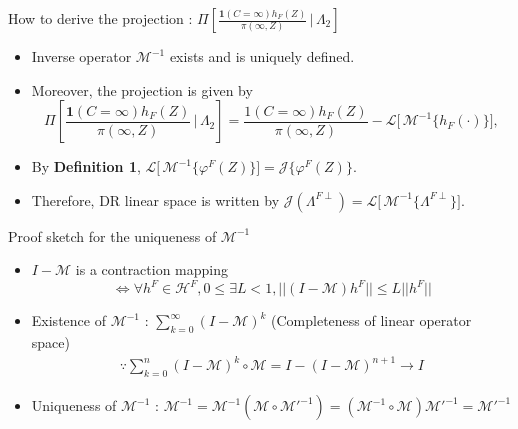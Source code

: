 \documentclass[xcolor=dvipsnames,aspectratio=169]{beamer}
\newcommand{\1}{\mathbbm{1}}
\begin{document}
\begin{frame}{How to derive the projection : $\Pi\!\left[
        \frac{\mathbf{1}(C=\infty)h_F(Z)}{\pi(\infty,Z)}
        \,\Bigg|\, \Lambda_2
        \right]$}
  \begin{tcolorbox}[colframe=Cyan,title=Theorem 10.6]
    \begin{itemize}
      \item Inverse operator $\mathcal{M}^{-1}$ exists and is uniquely defined. 
      \item Moreover, the projection is given by
      \[
        \Pi\!\left[
        \frac{\mathbf{1}(C=\infty)h_F(Z)}{\pi(\infty,Z)}
        \,\Bigg|\, \Lambda_2
        \right]
        = \frac{\mathcal{1} (C=\infty)h_F(Z)}{\pi(\infty,Z)} 
        - \mathcal{L}\!\big[\,\mathcal{M}^{-1}\{h_F(\cdot)\}\big],
    \]
    \end{itemize}
  \end{tcolorbox}
  \begin{itemize}
    \item By \textbf{Definition 1}, $\mathcal{L}\!\big[\,\mathcal{M}^{-1}\{\varphi^F(Z)\}\big]=\mathcal{J}\{\varphi^F(Z)\}$.
    \item Therefore, DR linear space is written by $\mathcal{J}(\Lambda^{F\perp})=\mathcal{L}\!\big[\,\mathcal{M}^{-1}\{\Lambda^{F\perp}\}\big]$.
  \end{itemize}
\end{frame}

\begin{frame}{Proof sketch for the uniqueness of $\mathcal{M}^{-1}$}
  \begin{itemize}
    \item $I-\mathcal{M}$ is a contraction mapping 
    \[
    \Leftrightarrow \forall h^F\in\mathcal{H}^F, 0\leq \exists L<1, ||(I-\mathcal{M})h^F||\leq L||h^F||
    \]
    \item Existence of $\mathcal{M}^{-1}$ : $\sum_{k=0}^{\infty}(I-\mathcal{M})^k$ (Completeness of linear operator space)
    \begin{align*}
      \because \sum_{k=0}^n(I-\mathcal{M})^k\circ \mathcal{M}=I-(I-\mathcal{M})^{n+1}\rightarrow I \tag{as $n\to \infty$}
    \end{align*}
    \item Uniqueness of $\mathcal{M}^{-1}$ : $\mathcal{M}^{-1}=\mathcal{M}^{-1}(\mathcal{M}\circ \mathcal{M'}^{-1})=(\mathcal{M}^{-1}\circ \mathcal{M})\mathcal{M'}^{-1}=\mathcal{M'}^{-1}$
  \end{itemize}
\end{frame}
\end{document}
